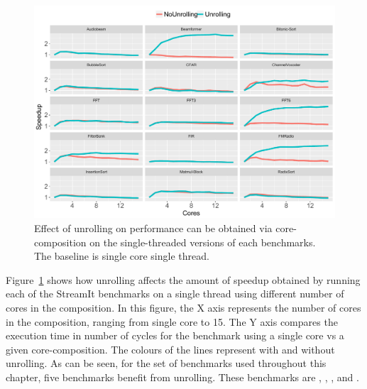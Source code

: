 \begin{figure}[t]
  \includegraphics[width=1\textwidth]{streamit-paper/graphics/unroll_speed_bars2.pdf}
  \caption{Effect of unrolling on performance can be obtained via core-composition on the single-threaded versions of each benchmarks. The baseline is single core single thread.}\label{fig:unroll_summary}
\end{figure}

Figure~\ref{fig:unroll_summary} shows how unrolling affects the amount of speedup obtained by running each of the StreamIt benchmarks on a single thread using different number of cores in the composition.
In this figure, the X axis represents the number of cores in the composition, ranging from single core to 15.
The Y axis compares the execution time in number of cycles for the benchmark using a single core vs a given core-composition.
The colours of the lines represent with and without unrolling.
As can be seen, for the set of benchmarks used throughout this chapter, five benchmarks benefit from unrolling.
These benchmarks are , , ,  and . 


